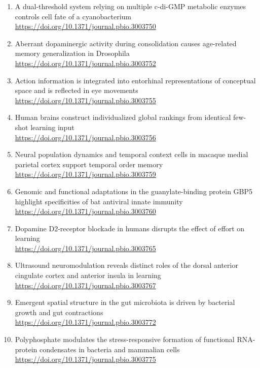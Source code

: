 \begin{enumerate}
        \url{https://doi.org/10.1371/journal.pbio.3003749}
  \item A dual-threshold system relying on multiple c-di-GMP metabolic enzymes controls cell fate of a cyanobacterium\\
        \url{https://doi.org/10.1371/journal.pbio.3003750}
  \item Aberrant dopaminergic activity during consolidation causes age-related memory generalization in Drosophila\\
        \url{https://doi.org/10.1371/journal.pbio.3003752}
  \item Action information is integrated into entorhinal representations of conceptual space and is reflected in eye movements\\
        \url{https://doi.org/10.1371/journal.pbio.3003755}
  \item Human brains construct individualized global rankings from identical few-shot learning input\\
        \url{https://doi.org/10.1371/journal.pbio.3003756}
  \item Neural population dynamics and temporal context cells in macaque medial parietal cortex support temporal order memory\\
        \url{https://doi.org/10.1371/journal.pbio.3003759}
  \item Genomic and functional adaptations in the guanylate-binding protein GBP5 highlight specificities of bat antiviral innate immunity\\
        \url{https://doi.org/10.1371/journal.pbio.3003760}
  \item Dopamine D2-receptor blockade in humans disrupts the effect of effort on learning\\
        \url{https://doi.org/10.1371/journal.pbio.3003765}
  \item Ultrasound neuromodulation reveals distinct roles of the dorsal anterior cingulate cortex and anterior insula in learning\\
        \url{https://doi.org/10.1371/journal.pbio.3003767}
  \item Emergent spatial structure in the gut microbiota is driven by bacterial growth and gut contractions\\
        \url{https://doi.org/10.1371/journal.pbio.3003772}
  \item Polyphosphate modulates the stress-responsive formation of functional RNA-protein condensates in bacteria and mammalian cells\\
        \url{https://doi.org/10.1371/journal.pbio.3003775}

\end{enumerate}
